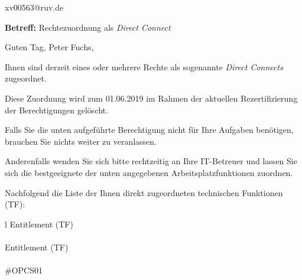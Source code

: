 \documentclass[a4paper,landscape,12pt]{letter}
\begin{document}
\begin{letter}{xv00563@ruv.de\hfill \break}
\begin{normalsize}
	\opening{\textbf{Betreff:} Rechtezuordnung als \emph{Direct Connect}}
	\begin{normalsize} \hfill
	\end{normalsize}

	\begin{normalsize}
		Guten Tag, 
	Peter Fuchs, \hfill \break
	\end{normalsize}
	\end{normalsize}
	
\begin{normalsize}
	Ihnen sind derzeit eines oder mehrere Rechte als sogenannte \emph{Direct Connects} zugeordnet.
	
	Diese Zuordnung wird zum 01.06.2019 im Rahmen der aktuellen Rezertifizierung der Berechtigungen gelöscht.
	
	Falls Sie die unten aufgeführte Berechtigung nicht für Ihre Aufgaben benötigen, 
	brauchen Sie nichts weiter zu veranlassen.
	
	Anderenfalls wenden Sie sich bitte rechtzeitig an Ihre IT-Betreuer 
	und lassen Sie sich die bestgeeignete der unten angegebenen Arbeitsplatzfunktionen zuordnen.
	\end{normalsize}
	
\begin{normalsize}
	Nachfolgend die Liste der Ihnen direkt zugeordneten technischen Funktionen (TF):

	\begin{longtable}{l}
		Entitlement (TF) \\ \hline
		\endfirsthead
		\\\hline
		Entitlement (TF) \\ \hline
		\endhead %
		\multicolumn{1}{r@{}}{Fortsetzung \ldots}\\
		\endfoot
		\hline
		\endlastfoot
	\#OPCS01\\
	\end{longtable}
	\end{normalsize}
	

\end{letter}
\end{document}
